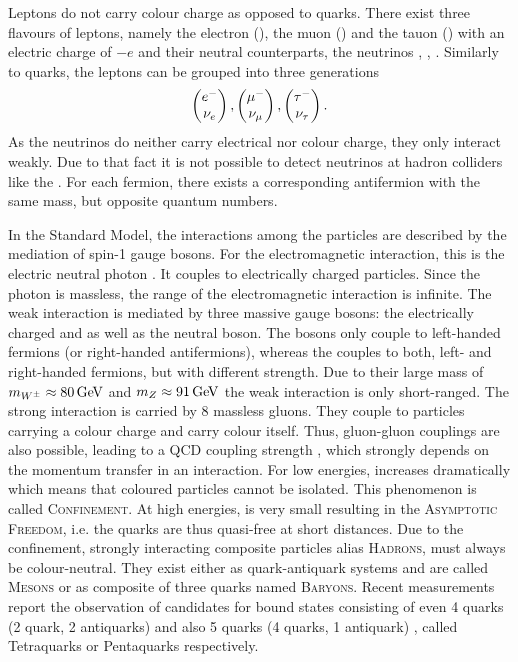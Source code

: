 Leptons do not carry colour charge as opposed to quarks.
There exist three flavours of leptons, namely the electron (\en), the muon (\mun) and the tauon (\taum) with an electric charge of $-e$ and their neutral counterparts, the neutrinos \neue, \neum, \neut.
Similarly to quarks, the leptons can be grouped into three generations
\begin{align*}
    \begin{pmatrix} {\ensuremath{e^-}} \\ {{\nu}_e} \end{pmatrix},
    \begin{pmatrix} {\ensuremath{\mu^-}} \\ {{\nu}_\mu} \end{pmatrix},
    \begin{pmatrix} {\ensuremath{\tau^-}} \\ {{\nu}_\tau} \end{pmatrix}.
\end{align*}
As the neutrinos do neither carry electrical nor colour charge, they only interact weakly.
Due to that fact it is not possible to detect neutrinos at hadron colliders like the \lhc.
For each fermion, there exists a corresponding antifermion with the same mass, but opposite quantum numbers.

In the Standard Model, the interactions among the particles are described by the mediation of spin-1 gauge bosons.
For the electromagnetic interaction, this is the electric neutral photon \g.
It couples to electrically charged particles.
Since the photon is massless, the range of the electromagnetic interaction is infinite.
The weak interaction is mediated by three massive gauge bosons:
the electrically charged \Wp and \Wm as well as the neutral \Z boson.
The \Wpm bosons only couple to left-handed fermions (or right-handed antifermions), whereas the \Z couples to both, left- and right-handed fermions, but with different strength.
Due to their large mass of $m_{{W^\pm}} \approx 80 \mathrm{\,Ge\kern -0.1em V}$ and $m_{Z} \approx 91 \mathrm{\,Ge\kern -0.1em V}$ the weak interaction is only short-ranged.
The strong interaction is carried by 8 massless gluons.
They couple to particles carrying a colour charge and carry colour itself.
Thus, gluon-gluon couplings are also possible, leading to a QCD coupling strength \as, which strongly depends on the momentum transfer in an interaction.
For low energies, \as increases dramatically which means that coloured particles cannot be isolated.
This phenomenon is called \textsc{Confinement}.
At high energies, \as is very small resulting in the \textsc{Asymptotic Freedom}, i.e. the quarks are thus quasi-free at short distances.
Due to the confinement, strongly interacting composite particles alias \textsc{Hadrons}, must always be colour-neutral.
They exist either as quark-antiquark systems and are called \textsc{Mesons} or as composite of three quarks named \textsc{Baryons}.
Recent \lhcb measurements report the observation of candidates for bound states consisting of even 4 quarks (2 quark, 2 antiquarks) \cite{Tetraquark} and also 5 quarks (4 quarks, 1 antiquark) \cite{Pentaquark}, called Tetraquarks or Pentaquarks respectively.

